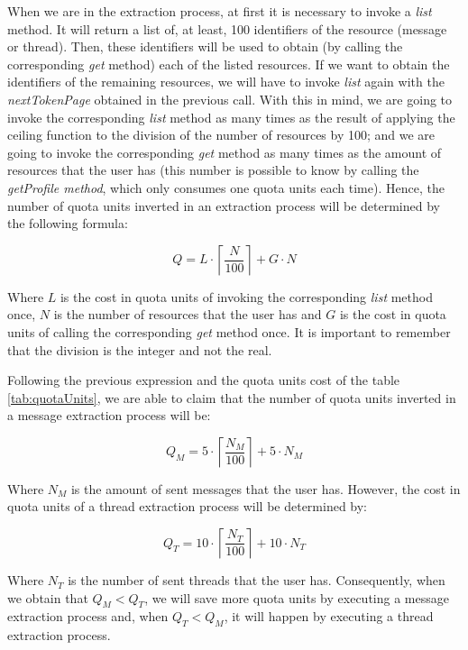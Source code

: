 When we are in the extraction process, at first it is necessary to invoke a \textit{list} method. It will return a list of, at least, 100 identifiers of the resource (message or thread). Then, these identifiers will be used to obtain (by calling the corresponding \textit{get} method) each of the listed resources. If we want to obtain the identifiers of the remaining resources, we will have to invoke \textit{list} again with the \textit{nextTokenPage} obtained in the previous call. With this in mind, we are going to invoke the corresponding \textit{list} method as many times as the result of applying the ceiling function to the division of the number of resources by 100; and we are going to invoke the corresponding \textit{get} method as many times as the amount of resources that the user has (this number is possible to know by calling the \textit{getProfile method}, which only consumes one quota units each time). Hence, the number of quota units inverted in an extraction process will be determined by the following formula:

$$
Q = L\cdot\left\lceil\frac{N}{100}\right\rceil+G\cdot N
$$

Where $L$ is the cost in quota units of invoking the corresponding \textit{list} method once, $N$ is the number of resources that the user has and $G$ is the cost in quota units of calling the corresponding \textit{get} method once. It is important to remember that the division is the integer and not the real.

Following the previous expression and the quota units cost of the table \ref{tab:quotaUnits}, we are able to claim that the number of quota units inverted in a message extraction process will be:

$$
Q_M = 5\cdot\left\lceil\frac{N_M}{100}\right\rceil+5\cdot N_M
$$

Where $N_M$ is the amount of sent messages that the user has. However, the cost in quota units of a thread extraction process will be determined by:

$$
Q_T = 10\cdot\left\lceil\frac{N_T}{100}\right\rceil+10\cdot N_T
$$

Where $N_T$ is the number of sent threads that the user has. Consequently, when we obtain that $Q_M < Q_T$, we will save more quota units by executing a message extraction process and, when $Q_T < Q_M$, it will happen by executing a thread extraction process.

